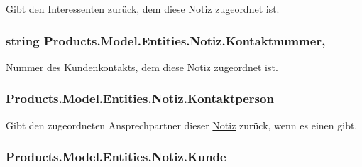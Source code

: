 Gibt den Interessenten zurück, dem diese \hyperlink{class_products_1_1_model_1_1_entities_1_1_notiz}{Notiz} zugeordnet ist. 

\subsubsection[{\texorpdfstring{Kontaktnummer}{Kontaktnummer}}]{\setlength{\rightskip}{0pt plus 5cm}string Products.\+Model.\+Entities.\+Notiz.\+Kontaktnummer\hspace{0.3cm}{\ttfamily [get]}, {\ttfamily [set]}}\hypertarget{class_products_1_1_model_1_1_entities_1_1_notiz_a2abb7d925401c63a07c6a23e0d88e5a6}{}\label{class_products_1_1_model_1_1_entities_1_1_notiz_a2abb7d925401c63a07c6a23e0d88e5a6}


Nummer des Kundenkontakts, dem diese \hyperlink{class_products_1_1_model_1_1_entities_1_1_notiz}{Notiz} zugeordnet ist. 

\subsubsection[{\texorpdfstring{Kontaktperson}{Kontaktperson}}]{ Products.\+Model.\+Entities.\+Notiz.\+Kontaktperson\hspace{0.3cm}{\ttfamily [get]}}\hypertarget{class_products_1_1_model_1_1_entities_1_1_notiz_aa31db98a057738b3144ff1df4348ee5c}{}\label{class_products_1_1_model_1_1_entities_1_1_notiz_aa31db98a057738b3144ff1df4348ee5c}


Gibt den zugeordneten Ansprechpartner dieser \hyperlink{class_products_1_1_model_1_1_entities_1_1_notiz}{Notiz} zurück, wenn es einen gibt. 

\subsubsection[{\texorpdfstring{Kunde}{Kunde}}]{ Products.\+Model.\+Entities.\+Notiz.\+Kunde\hspace{0.3cm}{\ttfamily [get]}}\hypertarget{class_products_1_1_model_1_1_entities_1_1_notiz_ace6e198bcd8675da7b18e0f3143745cc}{}\label{class_products_1_1_model_1_1_entities_1_1_notiz_ace6e198bcd8675da7b18e0f3143745cc}


